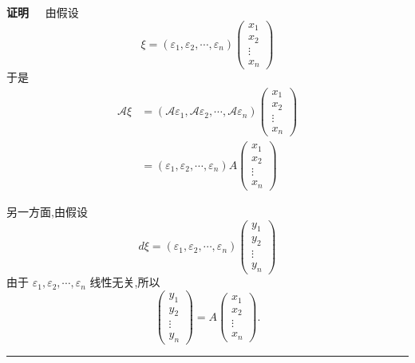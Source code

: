 \documentclass[13pt]{beamer}
\def\qed{\nopagebreak\hfill{\rule{4pt}{7pt}}\medbreak}
\def\pf{{\bf 证明~~ }}
\def\A{\mathscr{A}}
\begin{document}
\begin{frame}
\pf 由假设
\[
\xi=\left(\varepsilon_{1}, \varepsilon_{2}, \cdots, \varepsilon_{n}\right)\left(\begin{array}{c}
x_{1} \\
x_{2} \\
\vdots \\
x_{n}
\end{array}\right)
\]
于是
\begin{align*}
\A \xi & =\left(\A \varepsilon_{1}, \A \varepsilon_{2}, \cdots, \A \varepsilon_{n}\right)\left(\begin{array}{c}
x_{1} \\
x_{2} \\
\vdots \\
x_{n}
\end{array}\right) \\
& =\left(\varepsilon_{1}, \varepsilon_{2}, \cdots, \varepsilon_{n}\right) A\left(\begin{array}{c}
x_{1} \\
x_{2} \\
\vdots \\
x_{n}
\end{array}\right)
\end{align*}

\end{frame}


\begin{frame}
另一方面,由假设
\[
d \xi=\left(\varepsilon_{1}, \varepsilon_{2}, \cdots, \varepsilon_{n}\right)\left(\begin{array}{c}
y_{1} \\
y_{2} \\
\vdots \\
y_{n}
\end{array}\right)
\]
由于 ${\varepsilon}_{1}, {\varepsilon}_{2}, \cdots, {\varepsilon}_{n}$ 线性无关,所以
\[
\left(\begin{array}{c}
y_{1} \\
y_{2} \\
\vdots \\
y_{n}
\end{array}\right)=A\left(\begin{array}{c}
x_{1} \\
x_{2} \\
\vdots \\
x_{n}
\end{array}\right) .
\]
\qed

\end{frame}
\end{document}
